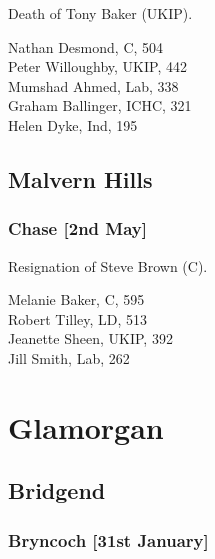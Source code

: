 \documentclass[a4paper,openany,10pt]{book}
\begin{document}

Death of Tony Baker (UKIP).



Nathan Desmond, C, 504\\
Peter Willoughby, UKIP, 442\\
Mumshad Ahmed, Lab, 338\\
Graham Ballinger, ICHC, 321\\
Helen Dyke, Ind, 195\\


\subsection*{Malvern Hills}

\subsubsection*{Chase \hspace*{\fill}\nolinebreak[1]%
\enspace\hspace*{\fill}
[2nd May]}


Resignation of Steve Brown (C).



Melanie Baker, C, 595\\
Robert Tilley, LD, 513\\
Jeanette Sheen, UKIP, 392\\
Jill Smith, Lab, 262\\




\section{Glamorgan}

\subsection*{Bridgend}

\subsubsection*{Bryncoch \hspace*{\fill}\nolinebreak[1]%
\enspace\hspace*{\fill}
[31st January]}
\end{document}
